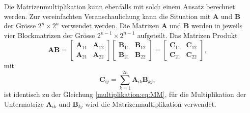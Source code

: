 Die Matrizenmultiplikation kann ebenfalls mit solch einem Ansatz berechnet werden.
Zur vereinfachten Veranschaulichung kann die Situation mit $\mathbf{A}$ und $\mathbf{B}$ der Gr\"osse $2^n \times 2^n$ verwendet werden.
Die Matrizen $\mathbf{A}$ und $\mathbf{B}$ werden in jeweils vier Blockmatrizen der Gr\"osse $2^{n-1} \times 2^{n-1}$ aufgeteilt.
Das Matrizen Produkt
\begin{equation}
\mathbf{A}\mathbf{B}=
\begin{bmatrix}
\mathbf{A}_{11} & \mathbf{A}_{12}\\
\mathbf{A}_{21} & \mathbf{A}_{22}
\end{bmatrix}
\begin{bmatrix}
\mathbf{B}_{11} & \mathbf{B}_{12}\\
\mathbf{B}_{21} & \mathbf{B}_{22}
\end{bmatrix}
=
\begin{bmatrix}
\mathbf{C}_{11} & \mathbf{C}_{12}\\
\mathbf{C}_{21} & \mathbf{C}_{22}
\end{bmatrix},
\end{equation}
mit \begin{equation}
\mathbf{C}_{ij} = \sum_{k=1}^{2n} \mathbf{A}_{ik} \mathbf{B}_{kj},
\label{multiplikation:eq:MM_block}
\end{equation}
ist identisch zu der Gleichung \eqref{multiplikation:eq:MM}, f\"ur die Multiplikation der Untermatrize $\mathbf{A}_{ik}$ und $\mathbf{B}_{kj}$ wird die Matrizenmultiplikation verwendet.

